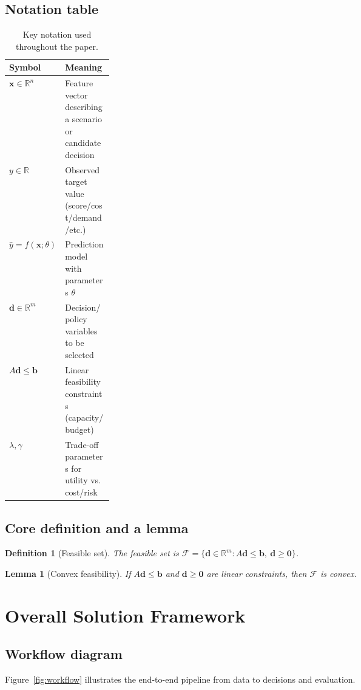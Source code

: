 \documentclass[12pt]{article}
\newtheorem{lemma}[theorem]{Lemma}
\newtheorem{definition}{Definition}
\newcommand{\R}{\mathbb{R}}
\newcommand{\vect}[1]{\boldsymbol{#1}}
\begin{document}
\subsection{Notation table}
\begin{table}[H]
\centering
\caption{Key notation used throughout the paper.}
\label{tab:notation}
\begin{tabularx}{0.95\linewidth}{>{\centering\arraybackslash}m{0.20\linewidth} X}
\toprule
\textbf{Symbol} & \textbf{Meaning} \\
\midrule
$\vect{x}\in\R^n$ & Feature vector describing a scenario or candidate decision \\
$y\in\R$ & Observed target value (score/cost/demand/etc.) \\
$\hat{y}=f(\vect{x};\theta)$ & Prediction model with parameters $\theta$ \\
$\vect{d}\in\R^m$ & Decision/policy variables to be selected \\
$A\vect{d}\le \vect{b}$ & Linear feasibility constraints (capacity/budget) \\
$\lambda,\gamma$ & Trade-off parameters for utility vs. cost/risk \\
\bottomrule
\end{tabularx}
\end{table}

\subsection{Core definition and a lemma}
\begin{definition}[Feasible set]
The feasible set is $\mathcal{F}=\{\vect{d}\in\R^m: A\vect{d}\le \vect{b},\ \vect{d}\ge \vect{0}\}$.
\end{definition}

\begin{lemma}[Convex feasibility]
If $A\vect{d}\le\vect{b}$ and $\vect{d}\ge\vect{0}$ are linear constraints, then $\mathcal{F}$ is convex.
\end{lemma}

\section{Overall Solution Framework}
\subsection{Workflow diagram}
Figure~\ref{fig:workflow} illustrates the end-to-end pipeline from data to decisions and evaluation.
\end{document}
